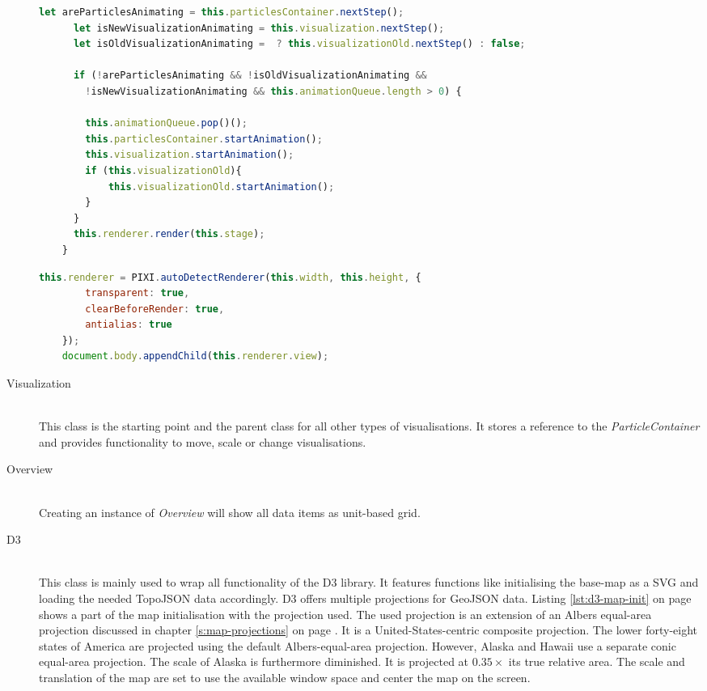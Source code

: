 \begin{description}
\begin{lstlisting}[language=JavaScript, caption={Render function of the canvas class.}, label={lst:canvas-render}]
      let areParticlesAnimating = this.particlesContainer.nextStep();
      let isNewVisualizationAnimating = this.visualization.nextStep();
      let isOldVisualizationAnimating =  ? this.visualizationOld.nextStep() : false;

      if (!areParticlesAnimating && !isOldVisualizationAnimating &&
        !isNewVisualizationAnimating && this.animationQueue.length > 0) {

        this.animationQueue.pop()();
        this.particlesContainer.startAnimation();
        this.visualization.startAnimation();
        if (this.visualizationOld){
            this.visualizationOld.startAnimation();
        }
      }
      this.renderer.render(this.stage);
    }
\end{lstlisting}

\begin{lstlisting}[language=JavaScript, caption={Pixi's autodetect-renderer.}, label={lst:canvas-autodecet-renderer}]
    this.renderer = PIXI.autoDetectRenderer(this.width, this.height, {
        transparent: true,
        clearBeforeRender: true,
        antialias: true
    });
    document.body.appendChild(this.renderer.view);
\end{lstlisting}

\item[Visualization] \hfill \\
This class is the starting point and the parent class for all other types of visualisations. It stores a reference to the \textit{ParticleContainer} and provides functionality to move, scale or change visualisations.

\item[Overview] \hfill \\
Creating an instance of \textit{Overview} will show all data items as unit-based grid.

\item[D3] \hfill \\
This class is mainly used to wrap all functionality of the \ac{D3} library. It features functions like initialising the base-map as a \ac{SVG} and loading the needed TopoJSON data accordingly. \ac{D3} offers multiple projections for GeoJSON data. Listing \ref{lst:d3-map-init} on page \pageref{lst:d3-map-init} shows a part of the map initialisation with the projection used. The used projection is an extension of an Albers equal-area projection discussed in chapter \ref{s:map-projections} on page \pageref{s:albers-equal-area-projection}. It is a United-States-centric composite projection. The lower forty-eight states of America are projected using the default Albers-equal-area projection. However, Alaska and Hawaii use a separate conic equal-area projection. The scale of Alaska is furthermore diminished. It is projected at $0.35\times$ its true relative area. The scale and translation of the map are set to use the available window space and center the map on the screen.


\end{description}

